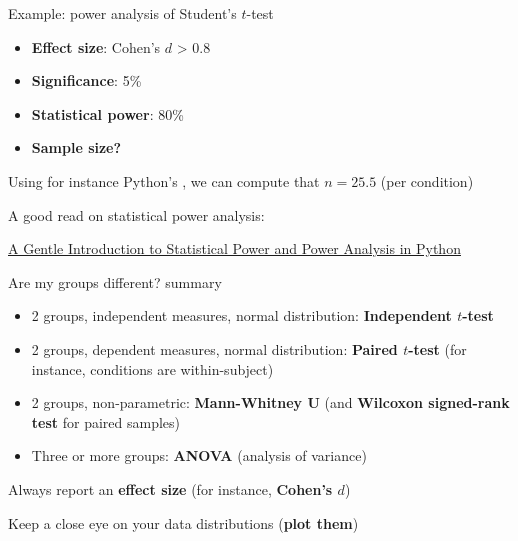 \documentclass[compress]{beamer}
\begin{document}
\begin{frame}{Example: power analysis of Student's $t$-test}

    \begin{itemize}
        \item \textbf{Effect size}: Cohen's $d$ > 0.8
        \item \textbf{Significance}: 5\%
        \item \textbf{Statistical power}: 80\%
        \item \textbf{Sample size?}

    \end{itemize}

    \pause

    Using for instance Python's ,
    we can compute that $n=25.5$ (per condition)

    \pause

    A good read on statistical power analysis:

    \href{https://machinelearningmastery.com/statistical-power-and-power-analysis-in-python/}{A
    Gentle Introduction to Statistical Power and Power Analysis in Python}
\end{frame}

\begin{frame}{Are my groups different? summary}

    \begin{itemize}
        \item<+-> 2 groups, independent measures, normal distribution:
            \textbf{Independent $t$-test}
        \item<+-> 2 groups, dependent measures, normal distribution: \textbf{Paired
            $t$-test} (for instance, conditions are within-subject)
        \item<+-> 2 groups, non-parametric: \textbf{Mann-Whitney U} (and
            \textbf{Wilcoxon signed-rank test} for paired samples)
        \item<+-> Three or more groups: \textbf{ANOVA} (analysis of variance)
    \end{itemize}

    \pause

    \begin{center}
    Always report an \textbf{effect size} (for instance, \textbf{Cohen's $d$})

    \pause

        Keep a close eye on your data distributions (\textbf{plot them})
    \end{center}


\end{frame}
\end{document}
